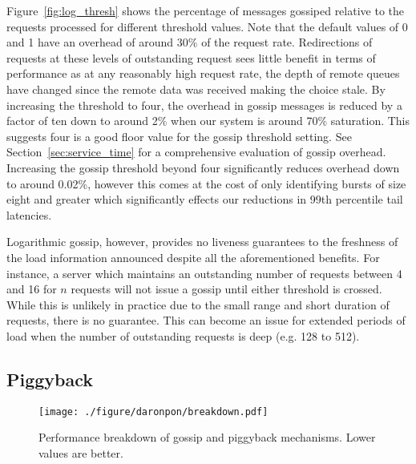 Figure~\ref{fig:log_thresh} shows the percentage of messages gossiped relative
to the requests processed for different threshold values.  Note that the
default values of 0 and 1 have an overhead of around 30\% of the request rate.
Redirections of requests at these levels of outstanding request sees little
benefit in terms of performance as at any reasonably high request rate, the
depth of remote queues have changed since the remote data was received making
the choice stale. 
%
By increasing the threshold to four, the overhead in gossip
messages is reduced by a factor of ten down to around 2\% when our system is
around 70\% saturation. 
%
This suggests four is a good floor value for the gossip threshold setting.
%
See Section~\ref{sec:service_time} for a comprehensive
evaluation of gossip overhead. Increasing the gossip threshold beyond four
significantly reduces overhead down to around 0.02\%, however this comes at the
cost of only identifying bursts of size eight and greater which significantly
effects our reductions in 99th percentile tail latencies.

Logarithmic gossip, however, provides no liveness
guarantees to the freshness of the load information announced despite all the aforementioned benefits. 
%
For instance, a server which maintains an outstanding number
of requests between 4 and 16 for $n$ requests will not issue a gossip
until either threshold is crossed. While this is unlikely in practice
due to the small range and short duration of requests, there is no
guarantee. This can become an issue for extended periods of load when
the number of outstanding requests is deep (e.g. 128 to 512).

\subsection{Piggyback}

\label{daronpon:sec:design:piggyback}
\begin{figure}[t]
  \centering
    \texttt{[image: ./figure/daronpon/breakdown.pdf]}
    \centering
    \caption{Performance breakdown of gossip and piggyback mechanisms.
    Lower values are better.} 
  \label{fig:breakdown}
\end{figure}

